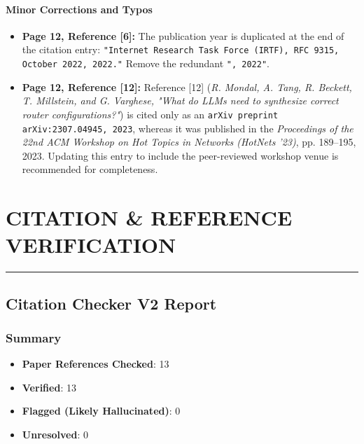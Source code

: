 \documentclass[11pt,a4paper]{article}
\begin{document}
\paragraph{Minor Corrections and Typos}
\begin{itemize}[leftmargin=1.8em,itemsep=2pt]
\item \textbf{Page 12, Reference [6]:} The publication year is duplicated at the end of the citation entry: \texttt{"Internet Research Task Force (IRTF), RFC 9315, October 2022, 2022."} Remove the redundant \texttt{", 2022"}.
\end{itemize}
\begin{itemize}[leftmargin=1.8em,itemsep=2pt]
\item \textbf{Page 12, Reference [12]:} Reference [12] (\emph{R. Mondal, A. Tang, R. Beckett, T. Millstein, and G. Varghese, "What do LLMs need to synthesize correct router configurations?"}) is cited only as an \texttt{arXiv preprint arXiv:2307.04945, 2023}, whereas it was published in the \emph{Proceedings of the 22nd ACM Workshop on Hot Topics in Networks (HotNets '23)}, pp. 189–195, 2023. Updating this entry to include the peer-reviewed workshop venue is recommended for completeness.
\end{itemize}
\section*{CITATION \& REFERENCE VERIFICATION}
\par\medskip\noindent\rule{\linewidth}{0.4pt}\medskip\par
\subsection*{Citation Checker V2 Report}
\subsubsection*{Summary}
\begin{itemize}[leftmargin=1.8em,itemsep=2pt]
\item \textbf{Paper References Checked}: 13
\item \textbf{Verified}: 13
\item \textbf{Flagged (Likely Hallucinated)}: 0
\item \textbf{Unresolved}: 0
\end{itemize}
\end{document}

